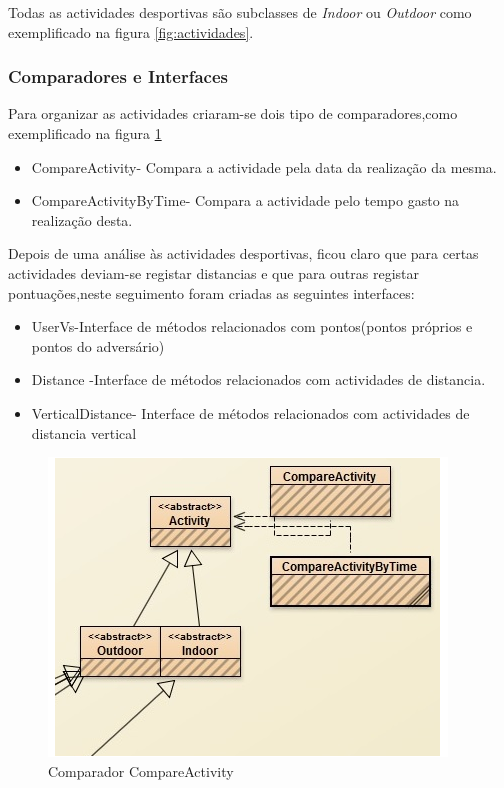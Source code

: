\documentclass[12pt,notitlepage]{article}
\begin{document}
Todas as actividades desportivas são subclasses de \textit{Indoor} ou \textit{Outdoor} como exemplificado na figura \ref{fig:actividades}.


\subsubsection{Comparadores e Interfaces}
Para organizar as actividades criaram-se dois tipo de comparadores,como exemplificado na figura \ref{fig:CompareActivity}

\begin{itemize}
\item CompareActivity- Compara a actividade pela data da realização da mesma.
\item CompareActivityByTime- Compara a actividade pelo tempo gasto na realização desta.
\end{itemize}

Depois de uma análise às actividades desportivas, ficou claro que para certas actividades deviam-se registar distancias e que para outras registar pontuações,neste seguimento foram criadas as seguintes interfaces:

\begin{itemize}
\item UserVs-Interface de métodos relacionados com pontos(pontos próprios e pontos do adversário)
\item Distance -Interface de métodos relacionados com actividades de distancia.
\item VerticalDistance- Interface de métodos relacionados com actividades de distancia vertical
\end{itemize}

\newpage
\begin{figure}[ht]
\centering
\includegraphics[scale=0.7]{ComparadorActivity.png}
\caption{Comparador CompareActivity}
\label{fig:CompareActivity}
\end{figure}
\end{document}
